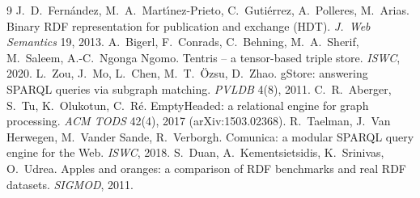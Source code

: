 \documentclass[sigconf, nonacm]{acmart}
\begin{document}
\begin{thebibliography}{9}
 J.~D.~Fern{\'a}ndez, M.~A.~Mart{\'\i}nez-Prieto, C.~Guti{\'e}rrez, A.~Polleres, M.~Arias. Binary RDF representation for publication and exchange (HDT). \emph{J.\ Web Semantics} 19, 2013.
 A.~Bigerl, F.~Conrads, C.~Behning, M.~A.~Sherif, M.~Saleem, A.-C.~Ngonga Ngomo. Tentris -- a tensor-based triple store. \emph{ISWC}, 2020.
 L.~Zou, J.~Mo, L.~Chen, M.~T.~{\"O}zsu, D.~Zhao. gStore: answering SPARQL queries via subgraph matching. \emph{PVLDB} 4(8), 2011.
 C.~R.~Aberger, S.~Tu, K.~Olukotun, C.~R{\'e}. EmptyHeaded: a relational engine for graph processing. \emph{ACM TODS} 42(4), 2017 (arXiv:1503.02368).
 R.~Taelman, J.~Van Herwegen, M.~Vander Sande, R.~Verborgh. Comunica: a modular SPARQL query engine for the Web. \emph{ISWC}, 2018.
 S.~Duan, A.~Kementsietsidis, K.~Srinivas, O.~Udrea. Apples and oranges: a comparison of RDF benchmarks and real RDF datasets. \emph{SIGMOD}, 2011.
\end{thebibliography}
\end{document}

